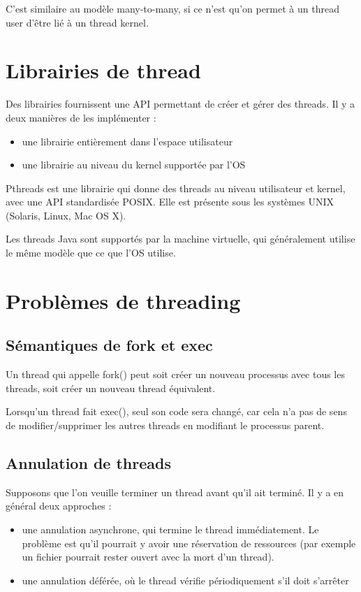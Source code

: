 	C'est similaire au modèle many-to-many, si ce n'est qu'on permet à un thread user d'être lié à un thread kernel.
	
	
\section{Librairies de thread}

Des librairies fournissent une API permettant de créer et gérer des threads. Il y a deux manières de les implémenter :

\begin{itemize}
	\item une librairie entièrement dans l'espace utilisateur
	\item une librairie au niveau du kernel supportée par l'OS
\end{itemize}

Pthreads est une librairie qui donne des threads au niveau utilisateur et kernel, avec une API standardisée POSIX. Elle est présente sous les systèmes UNIX (Solaris, Linux, Mac OS X).

Les threads Java sont supportés par la machine virtuelle, qui généralement utilise le même modèle que ce que l'OS utilise.

\section{Problèmes de threading}

	\subsection{Sémantiques de fork et exec}
	
	Un thread qui appelle fork() peut soit créer un nouveau processus avec tous les threads, soit créer un nouveau thread équivalent.
	
	Lorsqu'un thread fait exec(), seul son code sera changé, car cela n'a pas de sens de modifier/supprimer les autres threads en modifiant le processus parent.
	
	\subsection{Annulation de threads}
	
	Supposons que l'on veuille terminer un thread avant qu'il ait terminé. Il y a en général deux approches :
	
	\begin{itemize}
		\item une annulation asynchrone, qui termine le thread immédiatement. Le problème est qu'il pourrait y avoir une réservation de ressources (par exemple un fichier pourrait rester ouvert avec la mort d'un thread).
		\item une annulation déférée, où le thread vérifie périodiquement s'il doit s'arrêter
	\end{itemize}
	
